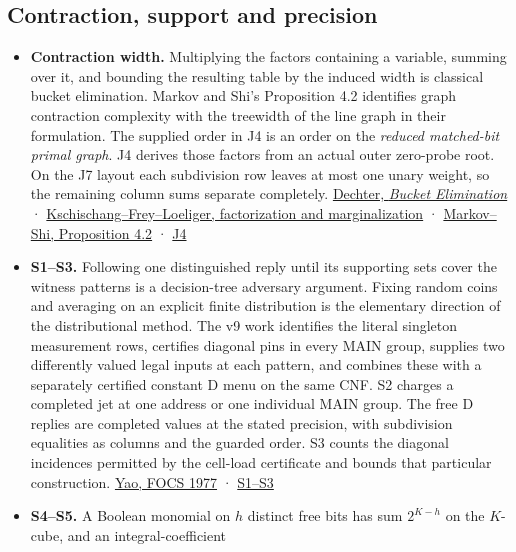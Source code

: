 \documentclass[
  11pt,
]{article}
\providecommand{\tightlist}{%
  \setlength{\itemsep}{0pt}\setlength{\parskip}{0pt}}
\begin{document}
\subsection{Contraction, support and
precision}\label{v9-contraction-support-and-precision}

\begin{itemize}
\tightlist
\item
  \textbf{Contraction width.} Multiplying the factors containing a
  variable, summing over it, and bounding the resulting table by the
  induced width is classical bucket elimination. Markov and Shi's
  Proposition 4.2 identifies graph contraction complexity with the
  treewidth of the line graph in their formulation. The supplied order
  in J4 is an order on the \emph{reduced matched-bit primal graph}. J4
  derives those factors from an actual outer zero-probe root. On the J7
  layout each subdivision row leaves at most one unary weight, so the
  remaining column sums separate completely.
  \href{https://ics.uci.edu/~dechter/publications/r48b.pdf}{Dechter,
  \emph{Bucket Elimination}} ·
  \href{https://www.mit.edu/~6.454/www_fall_2002/lizhong/factorgraph.pdf}{Kschischang--Frey--Loeliger,
  factorization and marginalization} ·
  \href{https://arxiv.org/pdf/quant-ph/0511069}{Markov--Shi, Proposition
  4.2} ·
  \hyperref[v9-j4-exact-contraction-of-an-outer-zero-probe-register]{J4}
\item
  \textbf{S1--S3.} Following one distinguished reply until its
  supporting sets cover the witness patterns is a decision-tree
  adversary argument. Fixing random coins and averaging on an explicit
  finite distribution is the elementary direction of the distributional
  method. The v9 work identifies the literal singleton measurement rows,
  certifies diagonal pins in every MAIN group, supplies two differently
  valued legal inputs at each pattern, and combines these with a
  separately certified constant D menu on the same CNF. S2 charges a
  completed jet at one address or one individual MAIN group. The free D
  replies are completed values at the stated precision, with subdivision
  equalities as columns and the guarded order. S3 counts the diagonal
  incidences permitted by the cell-load certificate and bounds that
  particular construction.
  \href{https://doi.org/10.1109/SFCS.1977.24}{Yao, FOCS 1977} ·
  \hyperref[v9-a-nonlinear-adaptive-obstruction-on-a-specified-native-interface]{S1--S3}
\item
  \textbf{S4--S5.} A Boolean monomial on \(h\) distinct free bits has
  sum \(2^{K-h}\) on the \(K\)-cube, and an integral-coefficient

\end{itemize}
\end{document}
